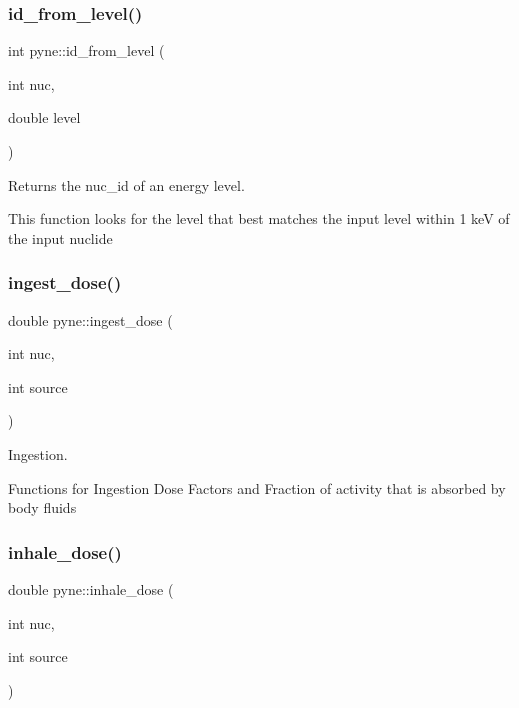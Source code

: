 \subsubsection{\texorpdfstring{id\+\_\+from\+\_\+level()}{id\_from\_level()}}
{\footnotesize\ttfamily int pyne\+::id\+\_\+from\+\_\+level (\begin{DoxyParamCaption}\item[{int}]{nuc,  }\item[{double}]{level }\end{DoxyParamCaption})}



Returns the nuc\+\_\+id of an energy level. 

This function looks for the level that best matches the input level within 1 keV of the input nuclide \mbox{\label{namespacepyne_a887bcaf7058c4b8aba27ba942fe7819a}} 
\subsubsection{\texorpdfstring{ingest\+\_\+dose()}{ingest\_dose()}}
{\footnotesize\ttfamily double pyne\+::ingest\+\_\+dose (\begin{DoxyParamCaption}\item[{int}]{nuc,  }\item[{int}]{source }\end{DoxyParamCaption})}



Ingestion. 

Functions for Ingestion Dose Factors and Fraction of activity that is absorbed by body fluids \mbox{\label{namespacepyne_ab1b598dc77d5c5f0c33f4d3d6d14a454}} 
\subsubsection{\texorpdfstring{inhale\+\_\+dose()}{inhale\_dose()}}
{\footnotesize\ttfamily double pyne\+::inhale\+\_\+dose (\begin{DoxyParamCaption}\item[{int}]{nuc,  }\item[{int}]{source }\end{DoxyParamCaption})}



